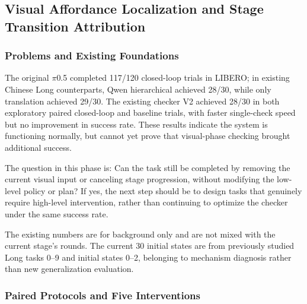 \subsection{Visual Affordance Localization and Stage Transition Attribution}\label{s12-detail-7}

\subsubsection{Problems and Existing Foundations}\label{s12-detail-8}

The original \(\pi\)0.5 completed 117/120 closed-loop trials in LIBERO; in existing Chinese Long counterparts, Qwen hierarchical achieved 28/30, while only translation achieved 29/30. The existing checker V2 achieved 28/30 in both exploratory paired closed-loop and baseline trials, with faster single-check speed but no improvement in success rate. These results indicate the system is functioning normally, but cannot yet prove that visual-phase checking brought additional success.

The question in this phase is: Can the task still be completed by removing the current visual input or canceling stage progression, without modifying the low-level policy or plan? If yes, the next step should be to design tasks that genuinely require high-level intervention, rather than continuing to optimize the checker under the same success rate.

The existing numbers are for background only and are not mixed with the current stage's rounds. The current 30 initial states are from previously studied Long tasks 0--9 and initial states 0--2, belonging to mechanism diagnosis rather than new generalization evaluation.

\subsubsection{Paired Protocols and Five Interventions}\label{s12-detail-9}

